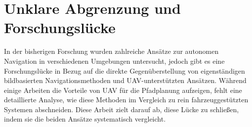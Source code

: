 \section{Unklare Abgrenzung und Forschungslücke}

In der bisherigen Forschung wurden zahlreiche Ansätze zur autonomen Navigation in verschiedenen Umgebungen untersucht, jedoch gibt es eine Forschungslücke in Bezug auf die direkte Gegenüberstellung von eigenständigen bildbasierten Navigationsmethoden und UAV-unterstützten Ansätzen. 
Während einige Arbeiten die Vorteile von \ac{UAV} für die Pfadplanung aufzeigen, fehlt eine detaillierte Analyse, wie diese Methoden im Vergleich zu rein fahrzeuggestützten Systemen abschneiden. 
Diese Arbeit zielt darauf ab, diese Lücke zu schließen, indem sie die beiden Ansätze systematisch vergleicht.
